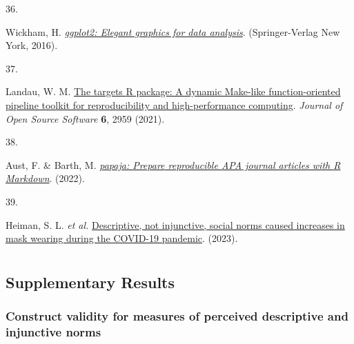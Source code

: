 \documentclass[
  man, donotrepeattitle,floatsintext]{apa6}
\newlength{\cslhangindent}
\newlength{\csllabelwidth}
\newlength{\cslentryspacingunit} %
\newenvironment{CSLReferences}[2] %
 {%
  \setlength{\parindent}{0pt}
  \ifodd #1
  \let\oldpar\par
  \def\par{\hangindent=\cslhangindent\oldpar}
  \fi
  \setlength{\parskip}{#2\cslentryspacingunit}
 }%
 {}
\newcommand{\CSLLeftMargin}[1]{\parbox[t]{\csllabelwidth}{#1}}
\newcommand{\CSLRightInline}[1]{\parbox[t]{\linewidth - \csllabelwidth}{#1}\break}
\begin{document}
\begin{CSLReferences}{0}{0}
\leavevmode{}%
\CSLLeftMargin{36. }%
\CSLRightInline{Wickham, H. \emph{\href{https://ggplot2.tidyverse.org}{{ggplot2}: Elegant graphics for data analysis}}. (Springer-Verlag New York, 2016).}

\leavevmode{}%
\CSLLeftMargin{37. }%
\CSLRightInline{Landau, W. M. \href{https://doi.org/10.21105/joss.02959}{The targets {R} package: A dynamic {M}ake-like function-oriented pipeline toolkit for reproducibility and high-performance computing}. \emph{Journal of Open Source Software} \textbf{6}, 2959 (2021).}

\leavevmode{}%
\CSLLeftMargin{38. }%
\CSLRightInline{Aust, F. \& Barth, M. \emph{\href{https://github.com/crsh/papaja}{{papaja}: {Prepare} reproducible {APA} journal articles with {R Markdown}}}. (2022).}

\leavevmode{}%
\CSLLeftMargin{39. }%
\CSLRightInline{Heiman, S. L. \emph{et al.} \href{https://github.com/ScottClaessens/covidMaskWearing}{Descriptive, not injunctive, social norms caused increases in mask wearing during the COVID-19 pandemic}. (2023).}

\end{CSLReferences}

\endgroup

\newpage

\hypertarget{appendix-appendix}{%
\appendix}


\renewcommand{\appendixname}{\textbf{Supplementary Material}}
\renewcommand{\thefigure}{S\arabic{figure}} \setcounter{figure}{0}
\renewcommand{\thetable}{S\arabic{table}} \setcounter{table}{0}
\renewcommand{\theequation}{S\arabic{table}} \setcounter{equation}{0}

\hypertarget{section}{%
\section{}\label{section}}

\hypertarget{supplementary-results}{%
\subsection{Supplementary Results}\label{supplementary-results}}

\hypertarget{construct-validity-for-measures-of-perceived-descriptive-and-injunctive-norms}{%
\subsubsection{Construct validity for measures of perceived descriptive and injunctive norms}\label{construct-validity-for-measures-of-perceived-descriptive-and-injunctive-norms}}
\end{document}
